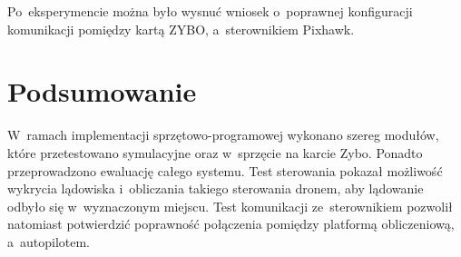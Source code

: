Po~eksperymencie można było wysnuć wniosek o~poprawnej konfiguracji komunikacji pomiędzy kartą ZYBO, a~sterownikiem Pixhawk.

\section{Podsumowanie}

W~ramach implementacji sprzętowo-programowej wykonano szereg modułów, które przetestowano symulacyjne oraz w~sprzęcie na karcie Zybo.
Ponadto przeprowadzono ewaluację całego systemu.
Test sterowania pokazał możliwość wykrycia lądowiska i~obliczania takiego sterowania dronem, aby lądowanie odbyło się w~wyznaczonym miejscu. 
Test komunikacji ze~sterownikiem pozwolił natomiast potwierdzić poprawność połączenia pomiędzy platformą obliczeniową, a~autopilotem. 
